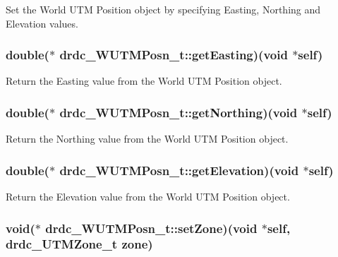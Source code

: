 Set the World UTM Position object by specifying Easting, Northing and Elevation values. 

\hypertarget{structdrdc__WUTMPosn__t_64ffface39fd90112695fb3e0d26b587}{
\subsubsection[getEasting]{\setlength{\rightskip}{0pt plus 5cm}double($\ast$ {\bf drdc\_\-WUTMPosn\_\-t::getEasting})(void $\ast$self)}}
\label{structdrdc__WUTMPosn__t_64ffface39fd90112695fb3e0d26b587}


Return the Easting value from the World UTM Position object. 

\hypertarget{structdrdc__WUTMPosn__t_d68032235695b2ced53538e02e090b75}{
\subsubsection[getNorthing]{\setlength{\rightskip}{0pt plus 5cm}double($\ast$ {\bf drdc\_\-WUTMPosn\_\-t::getNorthing})(void $\ast$self)}}
\label{structdrdc__WUTMPosn__t_d68032235695b2ced53538e02e090b75}


Return the Northing value from the World UTM Position object. 

\hypertarget{structdrdc__WUTMPosn__t_26cca9bcac6e57ce316839fd7bbe4fee}{
\subsubsection[getElevation]{\setlength{\rightskip}{0pt plus 5cm}double($\ast$ {\bf drdc\_\-WUTMPosn\_\-t::getElevation})(void $\ast$self)}}
\label{structdrdc__WUTMPosn__t_26cca9bcac6e57ce316839fd7bbe4fee}


Return the Elevation value from the World UTM Position object. 

\hypertarget{structdrdc__WUTMPosn__t_4b94b8f02165069e28d21375a2dda7df}{
\subsubsection[setZone]{\setlength{\rightskip}{0pt plus 5cm}void($\ast$ {\bf drdc\_\-WUTMPosn\_\-t::setZone})(void $\ast$self, {\bf drdc\_\-UTMZone\_\-t} {\bf zone})}}
\label{structdrdc__WUTMPosn__t_4b94b8f02165069e28d21375a2dda7df}


